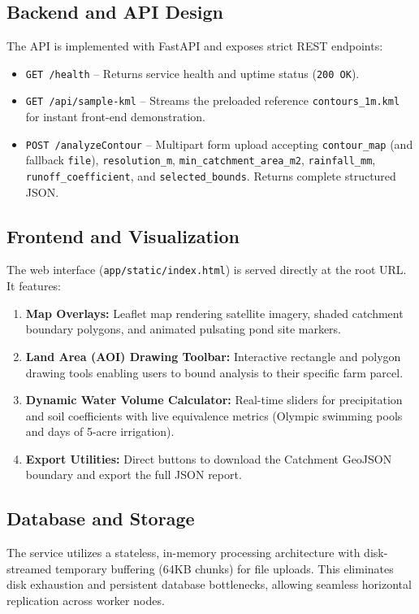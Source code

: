 \documentclass[manuscript,screen,review]{acmart}
\begin{document}
\subsection{Backend and API Design}
The API is implemented with FastAPI and exposes strict REST endpoints:
\begin{itemize}[noitemsep]
    \item \texttt{GET /health} -- Returns service health and uptime status (\texttt{200 OK}).
    \item \texttt{GET /api/sample-kml} -- Streams the preloaded reference \texttt{contours\_1m.kml} for instant front-end demonstration.
    \item \texttt{POST /analyzeContour} -- Multipart form upload accepting \texttt{contour\_map} (and fallback \texttt{file}), \texttt{resolution\_m}, \texttt{min\_catchment\_area\_m2}, \texttt{rainfall\_mm}, \texttt{runoff\_coefficient}, and \texttt{selected\_bounds}. Returns complete structured JSON.
\end{itemize}

\subsection{Frontend and Visualization}
The web interface (\texttt{app/static/index.html}) is served directly at the root URL. It features:
\begin{enumerate}[noitemsep]
    \item \textbf{Map Overlays:} Leaflet map rendering satellite imagery, shaded catchment boundary polygons, and animated pulsating pond site markers.
    \item \textbf{Land Area (AOI) Drawing Toolbar:} Interactive rectangle and polygon drawing tools enabling users to bound analysis to their specific farm parcel.
    \item \textbf{Dynamic Water Volume Calculator:} Real-time sliders for precipitation and soil coefficients with live equivalence metrics (Olympic swimming pools and days of 5-acre irrigation).
    \item \textbf{Export Utilities:} Direct buttons to download the Catchment GeoJSON boundary and export the full JSON report.
\end{enumerate}

\subsection{Database and Storage}
The service utilizes a stateless, in-memory processing architecture with disk-streamed temporary buffering (64KB chunks) for file uploads. This eliminates disk exhaustion and persistent database bottlenecks, allowing seamless horizontal replication across worker nodes.
\end{document}
